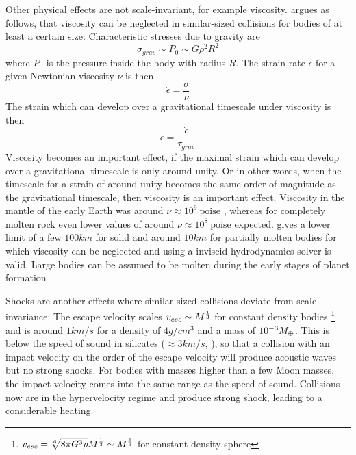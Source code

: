 Other physical effects are not scale-invariant, for example viscosity. \cite{Asphaug:2010p3539} argues as follows, that viscosity can be neglected in similar-sized collisions for bodies of at least a certain size: Characteristic stresses due to gravity are 
\begin{equation}
\sigma_{grav} \sim P_0 \sim G \rho^2 R^2
\end{equation}
where $P_0$ is the pressure inside the body with radius $R$. The strain rate $\dot{\epsilon}$ for a given Newtonian viscosity $\nu$ is then
\begin{equation}
\dot{\epsilon} = \frac{\sigma}{\nu}
\end{equation}
The strain which can develop over a gravitational timescale under viscosity is then
\begin{equation}
\epsilon = \frac{\dot{\epsilon}}{\tau_{grav}}
\end{equation}
Viscosity becomes an important effect, if the maximal strain which can develop over a gravitational timescale is only around unity. Or in other words, when the timescale for a strain of around unity becomes the same order of magnitude as the gravitational timescale, then viscosity is an important effect. Viscosity in the mantle of the early Earth was around $\nu \approx 10^9~\textrm{poise}$ \citep{2004Tectp.384...55W}, whereas for completely molten rock even lower values of around $\nu \approx 10^8~\textrm{poise}$ expected. \cite{Asphaug:2010p3539} gives a lower limit of a few $100km$ for solid and around $10km$ for partially molten bodies for which viscosity can be neglected and using a inviscid hydrodynamics solver is valid. Large bodies can be assumed to be molten during the early stages of planet formation 

Shocks are another effects where similar-sized collisions deviate from scale-invariance: The escape velocity scales $v_{esc} \sim M^\frac{1}{3}$ for constant density bodies \footnote{$v_{esc} = \sqrt[6]{8 \pi G^3 \rho} M^\frac{1}{3} \sim M^\frac{1}{3}$ for constant density sphere} and is around $1km/s$ for a density of $4g/cm^3$ and a mass of $10^{-3} M_{\oplus}$. This is below the speed of sound in silicates ($\approx 3 km/s$, \cite{Melosh:2007p3502}), so that a collision with an impact velocity on the order of the escape velocity will produce acoustic waves but no strong shocks. For bodies with masses higher than a few Moon masses, the impact velocity comes into the same range as the speed of sound. Collisions now are in the hypervelocity regime and produce strong shock, leading to a considerable heating. 

